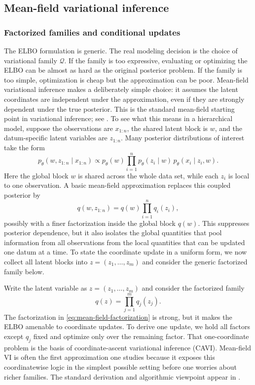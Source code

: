 \subsection{Mean-field variational inference}
\label{subsec:mean-field-vi}

\subsubsection{Factorized families and conditional updates}

The ELBO formulation is generic.
The real modeling decision is the choice of variational family \(\mathcal{Q}\).
If the family is too expressive, evaluating or optimizing the ELBO can be almost as hard as the original posterior problem.
If the family is too simple, optimization is cheap but the approximation can be poor.
Mean-field variational inference makes a deliberately simple choice:
it assumes the latent coordinates are independent under the approximation, even if they are strongly dependent under the true posterior.
This is the standard mean-field starting point in variational inference; see \citet[\S2.3]{blei_kucukelbir_mcauliffe_2017_vi_review}.
To see what this means in a hierarchical model, suppose the observations are \(x_{1:n}\), the shared latent block is \(w\), and the datum-specific latent variables are \(z_{1:n}\).
Many posterior distributions of interest take the form
\[
  p_\theta(w,z_{1:n}\mid x_{1:n})
  \propto
  p_\theta(w)\prod_{i=1}^n p_\theta(z_i\mid w)\,p_\theta(x_i\mid z_i,w).
\]
Here the global block \(w\) is shared across the whole data set, while each \(z_i\) is local to one observation.
A basic mean-field approximation replaces this coupled posterior by
\[
  q(w,z_{1:n})
  =
  q(w)\prod_{i=1}^n q_i(z_i),
\]
possibly with a finer factorization inside the global block \(q(w)\).
This suppresses posterior dependence, but it also isolates the global quantities that pool information from all observations from the local quantities that can be updated one datum at a time.
To state the coordinate update in a uniform form, we now collect all latent blocks into \(z=(z_1,\dots,z_m)\) and consider the generic factorized family below.

Write the latent variable as \(z=(z_1,\dots,z_m)\) and consider the factorized family
\begin{equation}
  q(z)
  =
  \prod_{j=1}^m q_j(z_j).
  \label{eq:mean-field-factorization}
\end{equation}
The factorization in \eqref{eq:mean-field-factorization} is strong, but it makes the ELBO amenable to coordinate updates.
To derive one update, we hold all factors except \(q_j\) fixed and optimize only over the remaining factor.
That one-coordinate problem is the basis of coordinate-ascent variational inference (CAVI).
Mean-field VI is often the first approximation one studies because it exposes this coordinatewise logic in the simplest possible setting before one worries about richer families.
The standard derivation and algorithmic viewpoint appear in \citet[\S2.4]{blei_kucukelbir_mcauliffe_2017_vi_review}.


